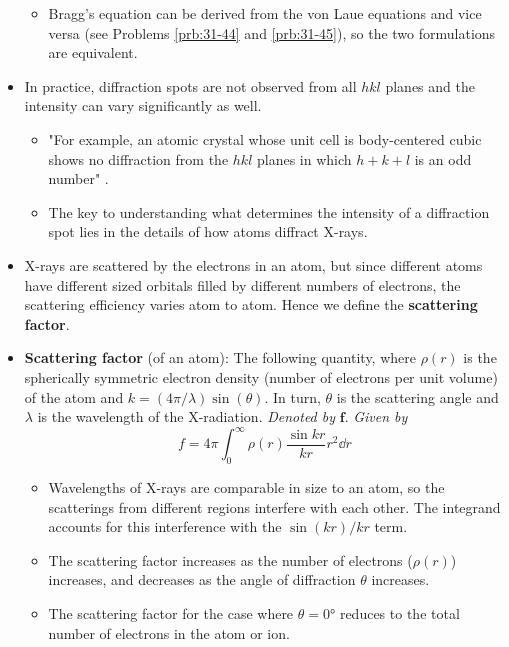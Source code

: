\documentclass[../notes.tex]{subfiles}
\begin{document}
\begin{itemize}
\begin{itemize}
        \item Bragg's equation can be derived from the von Laue equations and vice versa (see Problems \ref{prb:31-44} and \ref{prb:31-45}), so the two formulations are equivalent.
    \end{itemize}
    \item In practice, diffraction spots are not observed from all $hkl$ planes and the intensity can vary significantly as well.
    \begin{itemize}
        \item "For example, an atomic crystal whose unit cell is body-centered cubic shows no diffraction from the $hkl$ planes in which $h+k+l$ is an odd number" \parencite[1287]{bib:McQuarrieSimon}.
        \item The key to understanding what determines the intensity of a diffraction spot lies in the details of how atoms diffract X-rays.
    \end{itemize}
    \item X-rays are scattered by the electrons in an atom, but since different atoms have different sized orbitals filled by different numbers of electrons, the scattering efficiency varies atom to atom. Hence we define the \textbf{scattering factor}.
    \item \textbf{Scattering factor} (of an atom): The following quantity, where $\rho(r)$ is the spherically symmetric electron density (number of electrons per unit volume) of the atom and $k=(4\pi/\lambda)\sin(\theta)$. In turn, $\theta$ is the scattering angle and $\lambda$ is the wavelength of the X-radiation. \emph{Denoted by} $\bm{f}$. \emph{Given by}
    \begin{equation*}
        f = 4\pi\int_0^\infty\rho(r)\frac{\sin kr}{kr}r^2\dd{r}
    \end{equation*}
    \begin{itemize}
        \item Wavelengths of X-rays are comparable in size to an atom, so the scatterings from different regions interfere with each other. The integrand accounts for this interference with the $\sin(kr)/kr$ term.
        \item The scattering factor increases as the number of electrons ($\rho(r)$) increases, and decreases as the angle of diffraction $\theta$ increases.
        \item The scattering factor for the case where $\theta=\ang{0}$ reduces to the total number of electrons in the atom or ion.
    \end{itemize}

\end{itemize}
\end{document}
